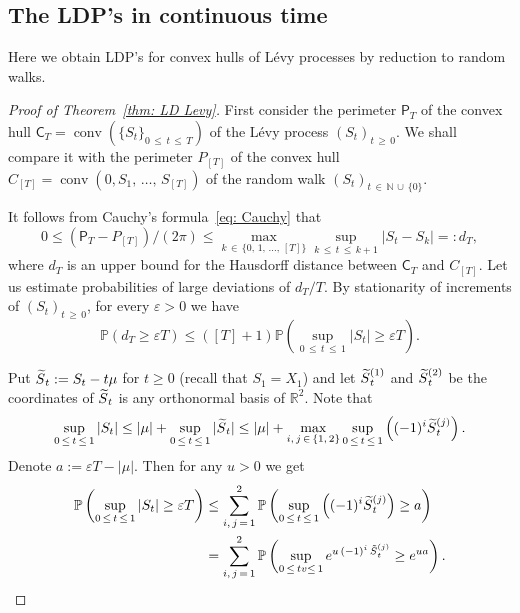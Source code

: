 \documentclass[AHL,Unicode,published]{cedram}
\DeclareMathOperator{\conv}{conv}
\newcommand{\Rbb}{\mathbb{R}}
\newcommand{\N}{\mathbb{N}}
\newcommand{\Pbb}{\mathbb{P}}
\newcommand{\sfC}{\mathsf{C}}
\newcommand{\sfP}{\mathsf{P}}
\let\oldtilde\tilde
\renewcommand*{\tilde}[1]{\mathchoice{\widetilde{#1}}{\widetilde{#1}}{\oldtilde{#1}}{\oldtilde{#1}}}
\begin{document}
\subsection{The LDP's in continuous time} \label{sec: continuous time proof}
Here we obtain LDP's for convex hulls of L\'evy processes by reduction to random walks.

\begin{proof}[Proof of Theorem~\ref{thm: LD Levy}]
First consider the perimeter $\sfP_T$ of the convex hull $\sfC_T= \conv(\{S_t\}_{0\,\le\,t\,\le\,T}) $ of the L\'evy process $(S_t)_{t\,\ge\,0}$. We shall compare it with the perimeter $P_{[T]}$ of the convex hull $C_{[T]}=\conv(0, S_1,\, \ldots,\,S_{[T]})$ of the random walk $(S_t)_{t\,\in\,\N\,\cup\, \{0\}}$.

It follows from Cauchy's formula~\eqref{eq: Cauchy} that
\[
0 \le \left(\sfP_T - P_{[T]}\right)/(2 \pi) \le \max_{k\,\in\, \{0,\,1,\,\ldots,\,[T]\}} \sup_{k\,\le\,t\,\le\,k+1}\left|S_t - S_k\right| =:d_T,
\]
where $d_T$ is an upper bound for the Hausdorff distance between $\sfC_T$ and $C_{[T]}$. Let us estimate probabilities of large deviations of $d_T/T$. By stationarity of increments of $(S_t)_{t\,\ge\,0}$, for every $\varepsilon>0$ we have
\[
\Pbb \left(d_T\ge \varepsilon T \right) \le ([T] +1) \Pbb \left(\sup_{0\,\le\,t\,\le\,1} |S_t | \ge \varepsilon T \right).
\]

Put $\tilde S_t :=S_t - t \mu$ for $t \ge 0$ (recall that $S_1 = X_1$) and let $\tilde S_t^{(1)}$ and $\tilde S_t^{(2)}$ be the coordinates of $\tilde S_t$ is any orthonormal basis of $\Rbb^2$. Note that
\[
\sup_{0\,\le\,t\,\le\,1} |S_t | \le |\mu| + \sup_{0\,\le\,t\,\le \,1} |\tilde S_t | \le |\mu| + \max_{i,\,j\,\in\,\{1,\,2\}} \sup_{0\,\le\,t\,\le\,1} \left((-1)^i \tilde S_t^{(j)} \right).
\]
Denote $a:= \varepsilon T- |\mu|$. Then for any $u>0$ we get
\begin{align*}
\Pbb \left(\sup_{0\,\le\,t\,\le\,1} |S_t | \ge \varepsilon T \right) &\le \sum_{i,\,j\,=\,1}^2 \Pbb \left(\sup_{0\,\le\,t\, \le\,1} \left((-1)^i \tilde S_t^{(j)} \right) \ge a \right) \\
&= \sum_{i,\,j\,=\,1}^2 \Pbb \left(\sup_{0\,\le\,tv\le\,1} e^{u \,(-1)^i\,\tilde S_t^{(j)}} \ge e^{u a} \right).
\end{align*}


\end{proof}
\end{document}
